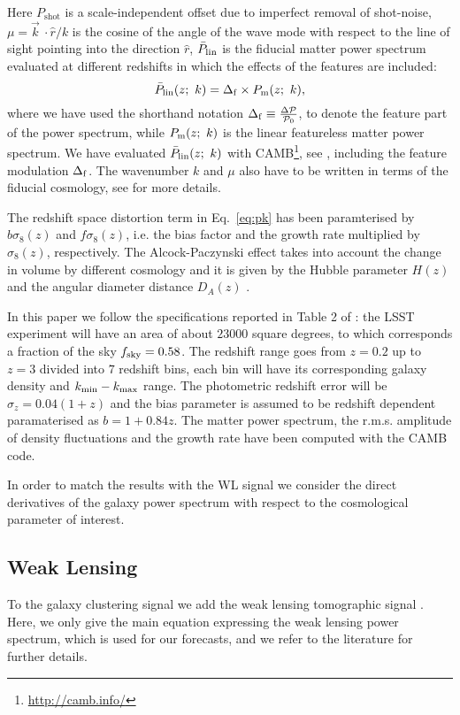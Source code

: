 \documentclass[12pt]{article}
\newcommand{\be}{\begin{equation}}
\newcommand{\ee}{\end{equation}}
\begin{document}
Here $P_\mathrm{shot}$ is a scale-independent offset due to imperfect removal of shot-noise, $\mu = \vec{k}\ \cdot\hat{r}/k$ is the cosine of the angle of the wave mode with respect to the line of sight pointing into the direction $\hat{r}$, $\bar{P}_{\rm lin}$ is the fiducial matter power spectrum evaluated at different redshifts in which the effects of the features are included:
\be
\bar{P}_{\rm lin}(z;~k) = \Delta_{\rm f} \times P_{\rm m}(z;~k),
\ee
where we have used the shorthand notation $\Delta_{\rm f}\equiv\frac{\Delta \mathcal P}{\mathcal P_0 }$, to denote the feature part of the power spectrum, while $P_{\rm m}(z;~k)$ is the linear featureless matter power spectrum. We have evaluated $\bar{P}_{\rm lin}(z;~k)$ with CAMB\footnote{\url{http://camb.info/}}, see \cite{LewisBS}, including the feature modulation $\Delta_{\rm f}$.  The wavenumber $k$ and $\mu$ also have to be written in terms of the fiducial cosmology, see \cite{SeoPU, SaponeJN,AmendolaBE} for more details. 

The redshift space distortion term in Eq.~\eqref{eq:pk} has been paramterised by $b\sigma_8(z)$ and $f\sigma_8(z)$, i.e. the bias factor and the growth rate multiplied by $\sigma_8(z)$, respectively. 
The Alcock-Paczynski effect takes into account the change in volume by different cosmology and it is given by the Hubble parameter $H(z)$ and the angular diameter distance $D_{A}(z)$ . 

In this paper we follow the specifications reported in Table 2 of \cite{Chen:2016vvw}: the LSST experiment will have an area of about  $23000$ square degrees, to which corresponds  a fraction of the sky $f_{\rm sky} = 0.58$.  
The redshift range goes from $z = 0.2$ up to $z=3$ divided into $7$ redshift bins, each bin will have its corresponding galaxy density and $k_{\rm min}-k_{\rm max}$ range. The photometric redshift error will be $\sigma_z = 0.04(1 + z)$  
and the bias parameter is assumed to be redshift dependent paramaterised as $b = 1 + 0.84z$. The matter power spectrum, the r.m.s. amplitude of density fluctuations and the growth rate have been computed with the CAMB code.

In order to match the results with the WL signal we consider the direct derivatives of the galaxy power spectrum with respect to the cosmological parameter of interest. 

\subsection{Weak Lensing} \label{subsec:wlps}
To the galaxy clustering signal we add the weak lensing tomographic signal \cite{wl-tomo, wl-tomo-2, wl-tomo-3, wl-tomo-4}. Here, we only give the main equation expressing the weak lensing power spectrum, which is used for our forecasts, and we refer to the literature for further details.
\end{document}
